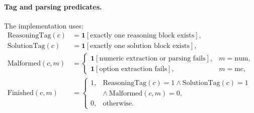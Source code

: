 \documentclass{article} %
\begin{document}
\paragraph{Tag and parsing predicates.}
The implementation uses:
\begin{align}
\mathrm{ReasoningTag}(c) &= \mathbf{1}[\text{exactly one reasoning block exists}], \\
\mathrm{SolutionTag}(c) &= \mathbf{1}[\text{exactly one solution block exists}], \\
\mathrm{Malformed}(c,m) &=
\begin{cases}
\mathbf{1}[\text{numeric extraction or parsing fails}], & m=\mathrm{num},\\
\mathbf{1}[\text{option extraction fails}], & m=\mathrm{mc},
\end{cases}\\
\mathrm{Finished}(c,m) &=
\begin{cases}
1, & \mathrm{ReasoningTag}(c)=1 \wedge \mathrm{SolutionTag}(c)=1 \\
   & \wedge\ \mathrm{Malformed}(c,m)=0,\\
0, & \text{otherwise}.
\end{cases}
\end{align}
\end{document}
